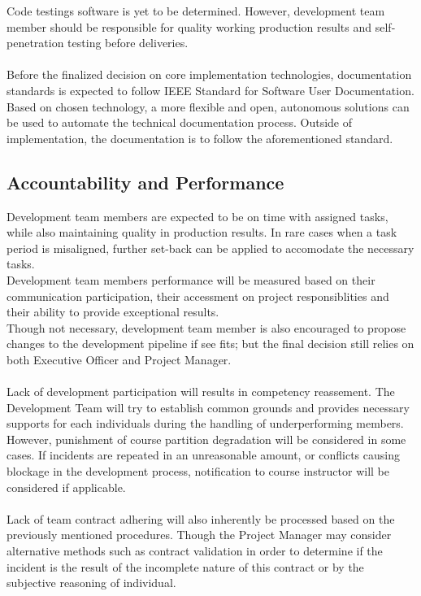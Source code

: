         Code testings software is yet to be determined. However, development team member should be responsible for quality working production results and self-penetration
        testing before deliveries.
        \\\\
        Before the finalized decision on core implementation technologies, documentation standards is expected to follow IEEE Standard for Software User Documentation.
        Based on chosen technology, a more flexible and open, autonomous solutions can be used to automate the technical documentation process. Outside of implementation,
        the documentation is to follow the aforementioned standard.

        \subsection{Accountability and Performance}
        Development team members are expected to be on time with assigned tasks, while also maintaining quality in production results. In rare cases when a task period
        is misaligned, further set-back can be applied to accomodate the necessary tasks.
        \\
        Development team members performance will be measured based on their communication participation, their accessment on project responsiblities and their ability to
        provide exceptional results. 
        \\
        Though not necessary, development team member is also encouraged to propose changes to the development pipeline if see fits; but the 
        final decision still relies on both Executive Officer and Project Manager.
        \\\\
        Lack of development participation will results in competency reassement. The Development Team will try to establish common grounds and provides necessary sup­ports
        for each individuals during the handling of underperforming members.
        \\
        However, punishment of course partition degradation will be considered in some cases.
        If incidents are repeated in an unreasonable amount, or conflicts causing blockage in the development process, notification to course instructor 
        will be considered if applicable.
        \\\\
        Lack of team contract adhering will also inherently be processed based on the previously mentioned procedures. Though the Project Manager may consider
        alternative methods such as contract validation in order to determine if the incident is the result of the incomplete nature of this contract or by the
        subjective reasoning of individual.

%




